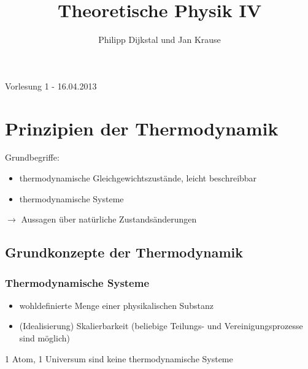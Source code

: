 \documentclass[10pt]{scrartcl}
\title{Theoretische Physik IV}
\author{Philipp Dijkstal und Jan Krause}
\begin{document}
\maketitle
\tableofcontents
\newpage
\begin{flushright}Vorlesung 1 - 16.04.2013\end{flushright}
\section{Prinzipien der Thermodynamik}
Grundbegriffe:
\begin{itemize}
\item thermodynamische Gleichgewichtszustände, leicht beschreibbar
\item thermodynamische Systeme
\end{itemize}
$\rightarrow$ Aussagen über natürliche Zustandsänderungen
\subsection{Grundkonzepte der Thermodynamik}
\subsubsection{Thermodynamische Systeme}
\begin{itemize}
\item wohldefinierte Menge einer physikalischen Substanz
\item (Idealisierung) Skalierbarkeit (beliebige Teilungs- und Vereinigungsprozesse sind möglich)
\end{itemize}
1 Atom, 1 Universum sind keine thermodynamische Systeme
\end{document}
